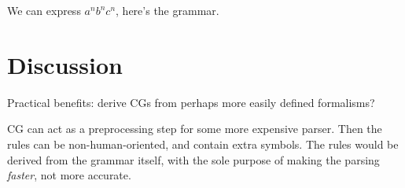 \documentclass[11pt]{article}
\begin{document}
We can express $a^nb^nc^n$, here's the grammar.  

\section{Discussion}

Practical benefits: derive CGs from perhaps more easily defined formalisms?

CG can act as a preprocessing step for some more expensive parser. Then the rules can be non-human-oriented, and contain extra symbols. The rules would be derived from the grammar itself, with the sole purpose of making the parsing \emph{faster}, not more accurate.






\end{document}
